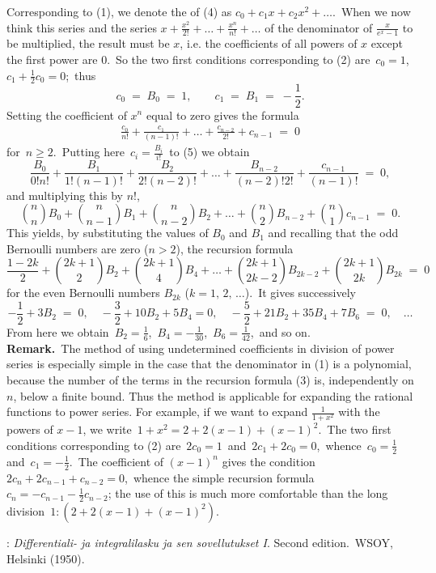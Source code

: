 \documentclass[12pt]{article}
\theoremstyle{definition}
\begin{document}
Corresponding to (1), we denote the  of (4) as $c_0+c_1x+c_2x^2+\ldots$.\, When we now think this series and the series $x+\frac{x^2}{2!}+\ldots+\frac{x^n}{n!}+\ldots$ of the denominator of
$\displaystyle\frac{x}{e^x-1}$ to be multiplied, the result must be $x$, i.e. the coefficients of all powers of $x$ except the first power are 0.\, So the two first conditions corresponding to (2) are\, 
$c_0 = 1$,\, $c_1+\frac{1}{2}c_0 = 0$;\, thus 
$$c_0 \;=\; B_0 \;=\; 1,\qquad c_1 \;=\; B_1 \;=\; -\frac{1}{2}.$$
Setting the coefficient of $x^n$ equal to zero gives the formula
\begin{align}
\frac{c_0}{n!}+\frac{c_1}{(n-1)!}+\ldots+\frac{c_{n-2}}{2!}+c_{n-1} \;=\; 0
\end{align}
for\, $n \geq 2$.\, Putting here\, $c_i = \frac{B_i}{i!}$\, to (5) we obtain
$$\frac{B_0}{0!n!}+\frac{B_1}{1!(n-1)!}+\frac{B_2}{2!(n-2)!}+\ldots+\frac{B_{n-2}}{(n-2)!2!}+\frac{c_{n-1}}{(n-1)!} 
\;=\; 0,$$
and multiplying this by $n!$, 
$${n\choose n}B_0+{n\choose n\!-\!1}{B_1}+{n\choose n\!-\!2}{B_2}+\ldots+{n\choose 2}B_{n-2}+{n\choose 1}c_{n-1} 
\;=\; 0.$$
This yields, by substituting the values of $B_0$ and $B_1$ and recalling that the odd Bernoulli numbers are zero ($n > 2$), the recursion formula
$$\frac{1\!-\!2k}{2}+{2k\!+\!1\choose 2}{B_2}+{2k\!+\!1\choose 4}{B_4}+\ldots+
{2k\!+\!1\choose 2k\!-\!2}B_{2k\!-\!2}+{2k\!+\!1\choose 2k}B_{2k} \;=\; 0$$
for the even Bernoulli numbers $B_{2k}$ ($k = 1,\,2,\,\ldots$).\, It gives successively
$$-\frac{1}{2}+3B_2 \;=\; 0,\quad -\frac{3}{2}+10B_2+5B_4 = 0,\quad -\frac{5}{2}+21B_2+35B_4+7B_6 \;=\; 0,\quad\ldots$$
From here we obtain\, $B_2 = \frac{1}{6}$,\, $B_4 = -\frac{1}{30}$,\, $B_6 = \frac{1}{42}$,\, and so on.\\

\textbf{Remark.}\, The method of using undetermined coefficients in division of power series is especially simple in the case that the denominator in (1) is a polynomial, because the number of the terms in the recursion formula (3) is, independently on $n$, below a finite bound.  Thus the method is applicable for expanding the rational functions to power series.  For example, if we want to expand $\frac{1}{1+x^2}$ with the powers of $x\!-\!1$, we write\, $1+x^2 = 2\!+\!2(x\!-\!1)\!+\!(x\!-\!1)^2$.\, The two first conditions corresponding to (2) are\, $2c_0 = 1$\, and\, 
$2c_1+2c_0 = 0$,\, whence\, $c_0 = \frac{1}{2}$\, and\, $c_1 = -\frac{1}{2}$.\, The coefficient of $(x\!-\!1)^n$ gives the condition $2c_n+2c_{n-1}+c_{n-2} = 0$,\, whence the simple recursion formula\, $c_n = -c_{n-1}-\frac{1}{2}c_{n-2}$; the use of this is much more comfortable than the long division \,$1:(2\!+\!2(x\!-\!1)\!+\!(x\!-\!1)^2)$.

\begin{thebibliography}{8}
: {\em Differentiali- ja integralilasku
ja sen sovellutukset I}.  Second edition.\, WSOY, Helsinki (1950).
\end{thebibliography} 

\end{document}
